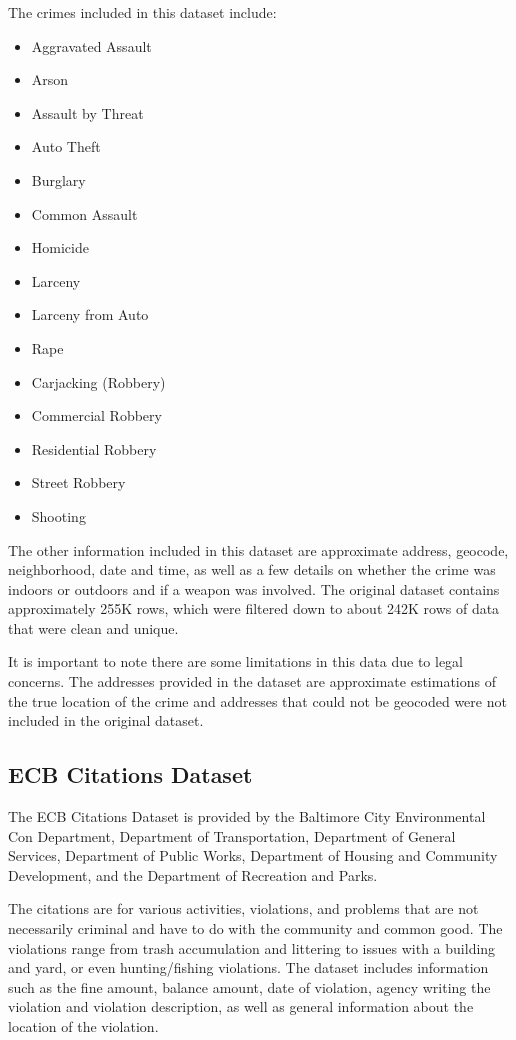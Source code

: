 \documentclass[conference]{IEEEtran}
\begin{document}
The crimes included in this dataset include:
\begin{itemize}
	\item Aggravated Assault
	\item Arson
	\item Assault by Threat
	\item Auto Theft
	\item Burglary
	\item Common Assault
	\item Homicide
	\item Larceny
	\item Larceny from Auto
	\item Rape
	\item Carjacking (Robbery)
	\item Commercial Robbery
	\item Residential Robbery
	\item Street Robbery
	\item Shooting
\end{itemize}

The other information included in this dataset are approximate address, geocode, neighborhood, date and time, as well as
a few details on whether the crime was indoors or outdoors and if a weapon was involved.
The original dataset contains approximately 255K rows, which were filtered down to about 242K rows of data that were
clean and unique.

It is important to note there are some limitations in this data due to legal concerns. The addresses provided in the
dataset are approximate estimations of the true location of the crime and addresses that could not be geocoded were
not included in the original dataset.


\subsection{ECB Citations Dataset}
The ECB Citations Dataset is provided by the Baltimore City Environmental Con Department,
Department of Transportation, Department of General Services, Department of Public Works, Department of Housing and
Community Development, and the Department of Recreation and Parks.

The citations are for various activities, violations, and problems that are not necessarily criminal and have to do with
the community and common good.  The violations range from trash accumulation and littering to issues with a building and
yard, or even hunting/fishing violations.  The dataset includes information such as the fine amount, balance amount,
date of violation, agency writing the violation and violation description, as well as general information about the
location of the violation.
\end{document}
